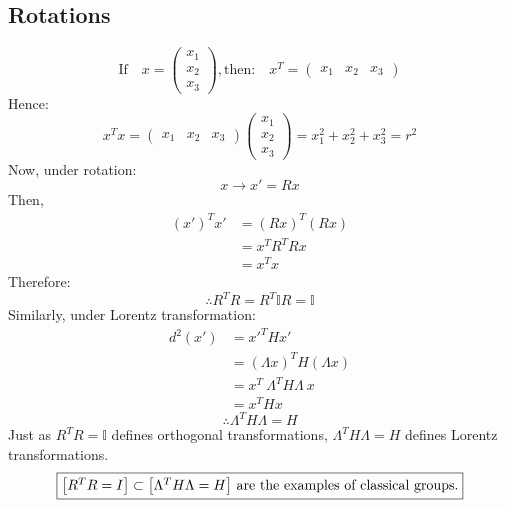\documentclass[14pt]{article} %
\begin{document}
\subsection*{Rotations}
\[
\text{If}\quad  x = \begin{pmatrix}
x_1 \\
x_2 \\
x_3
\end{pmatrix}, 
\text{then:} \quad
x^T = \begin{pmatrix}
x_1 & x_2 & x_3
\end{pmatrix}
\]
Hence:
\[
x^T x = 
\begin{pmatrix}
x_1 & x_2 & x_3
\end{pmatrix}
\begin{pmatrix}
x_1 \\
x_2 \\
x_3
\end{pmatrix}
= x_1^2 + x_2^2 + x_3^2
= r^2
\]
Now, under rotation:
\[
x \to x' = R x
\]
Then,
\begin{align*}
    (x')^T x' &= (Rx)^T (Rx) \\
    &= x^T R^T R x \\
    &= x^T x
\end{align*}
Therefore:
\[
\therefore\boxed{  R^T R = R^T \mathbb{I} R = \mathbb{I}}
\]
Similarly, under Lorentz transformation:
\begin{align*}
    d^2(x') &= x'^T H x' \\
    &= (\Lambda x)^T H (\Lambda x) \\
    &= x^T~\Lambda^T H \Lambda~x \\
    &= x^T H x
\end{align*}
\[
\therefore \boxed{\Lambda^T H \Lambda = H}
\]
Just as $R^T R = \mathbb{I}$ defines orthogonal transformations, $\Lambda^T H \Lambda = H$ defines Lorentz transformations.
$$\fbox{$\left[R^T R = I\right] \subset \left[\Lambda^T H \Lambda = H\right]$ \text{are the examples of classical groups.}}$$
\end{document}

